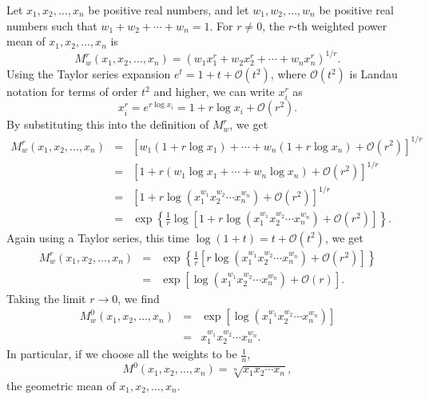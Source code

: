 \documentclass[12pt]{article}
\begin{document}
Let $x_1,x_2,\ldots,x_n$ be positive real numbers, and let
$w_1,w_2,\ldots,w_n$ be positive real numbers such that
$w_1+w_2+\cdots+w_n=1$.  For $r\neq 0$, the $r$-th weighted power mean
of $x_1,x_2,\ldots,x_n$ is
$$
M_w^r(x_1,x_2,\ldots,x_n)=(w_1x_1^r+w_2x_2^r+\cdots+w_nx_n^r)^{1/r}.
$$
Using the Taylor series expansion $e^t=1+t+{\mathcal O}(t^2)$, where ${\mathcal O}(t^2)$
is Landau notation for terms of order $t^2$ and higher, we can
write $x_i^r$ as
$$
x_i^r=e^{r\log x_i}=1+r\log x_i+{\mathcal O}(r^2).
$$
By substituting this into the definition of $M_w^r$, we get
\begin{eqnarray*}
M_w^r(x_1,x_2,\ldots,x_n)&=&\left[w_1(1+r\log x_1)
+\cdots+w_n(1+r\log x_n)+{\mathcal O}(r^2)\right]^{1/r}\\
&=&\left[1+r(w_1\log x_1+\cdots+w_n\log x_n)+{\mathcal O}(r^2)\right]^{1/r}\\
&=&\left[1+r\log(x_1^{w_1}x_2^{w_2}\cdots x_n^{w_n})+{\mathcal O}(r^2)\right]^{1/r}\\
&=&\exp\left\{\frac{1}{r}\log\left[1+r\log(x_1^{w_1}x_2^{w_2}\cdots
x_n^{w_n})+{\mathcal O}(r^2)\right]\right\}.
\end{eqnarray*}
Again using a Taylor series, this time $\log (1+t)=t+{\mathcal O}(t^2)$, we get
\begin{eqnarray*}
M_w^r(x_1,x_2,\ldots,x_n)&=&\exp\left\{\frac{1}{r}
\left[r\log(x_1^{w_1}x_2^{w_2}\cdots x_n^{w_n})+{\mathcal O}(r^2)\right]\right\}\\
&=&\exp\left[\log(x_1^{w_1}x_2^{w_2}\cdots x_n^{w_n})+{\mathcal O}(r)\right].
\end{eqnarray*}
Taking the limit $r\to 0$, we find
\begin{eqnarray*}
M_w^0(x_1,x_2,\ldots,x_n)&=&\exp\left[\log
(x_1^{w_1}x_2^{w_2}\cdots x_n^{w_n})\right]\\
&=&x_1^{w_1}x_2^{w_2}\cdots x_n^{w_n}.
\end{eqnarray*}
In particular, if we choose all the weights to be $\frac{1}{n}$,
$$
M^0(x_1,x_2,\ldots,x_n)=\sqrt[n]{x_1x_2\cdots x_n},
$$
the geometric mean of $x_1,x_2,\ldots,x_n$.
\end{document}
